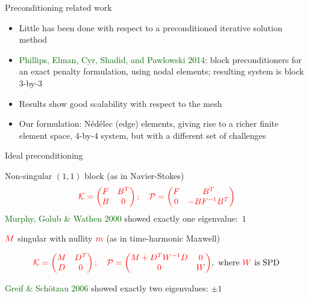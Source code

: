 \documentclass[12pt]{beamer}
\newcommand{\gr}[1]{\textcolor{darkgreen} {#1}}
\newcommand{\re}[1]{{\textcolor{red}       {#1}}}
\begin{document}
\begin{frame}{Preconditioning related work}

\begin{itemize}
    \item Little has been done with respect to a preconditioned iterative solution method
    \item   \gr{Phillips, Elman, Cyr, Shadid, and Pawlowski 2014}: block preconditioners for an exact penalty formulation, using nodal elements; resulting system is block 3-by-3
    \item Results show good scalability with respect to the mesh
    \item Our formulation: {N\'{e}d\'{e}lec} (edge) elements, giving rise to a richer finite element space, 4-by-4 system, but with a different set of challenges
\end{itemize}


\end{frame}
\begin{frame}{Ideal preconditioning}

Non-singular $(1,1)$ block (as in Navier-Stokes)
\begin{equation}\nonumber
\re{\mathcal{K} = \begin{pmatrix}
F & B^T \\
B & 0
\end{pmatrix}; \quad
\mathcal{P}=\begin{pmatrix}
F & B^T\\
0 & -B F^{-1} B^T
\end{pmatrix}}
\end{equation}
\gr{Murphy, Golub \& Wathen 2000} showed exactly one eigenvalue:~$1$ %

\vspace{5mm}
\pause
$\re{M}$ singular with nullity $\re{m}$ (as in time-harmonic Maxwell)

\begin{equation}\nonumber
\re{\mathcal{K} = \begin{pmatrix}
M & D^T \\
D & 0
\end{pmatrix}; \quad
\mathcal{P}=\begin{pmatrix}
M+D^T W^{-1} D & 0 \\
0 & W
\end{pmatrix}}, \ \mbox{where $\re{W}$ is SPD}
\end{equation}

\gr{Greif \& Sch{\"o}tzau 2006} showed exactly two eigenvalues: $\pm 1$

\end{frame}
\end{document}
